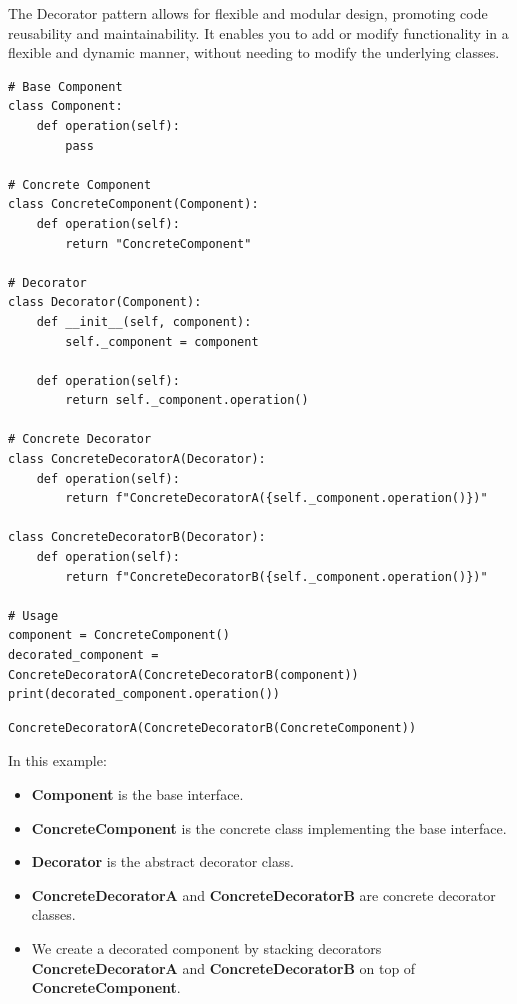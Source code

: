 The Decorator pattern allows for flexible and modular design, promoting code reusability and maintainability. It enables you to add or modify functionality in a flexible and dynamic manner, without needing to modify the underlying classes.\\

\begin{codebox}
\begin{verbatim}
# Base Component
class Component:
    def operation(self):
        pass

# Concrete Component
class ConcreteComponent(Component):
    def operation(self):
        return "ConcreteComponent"

# Decorator
class Decorator(Component):
    def __init__(self, component):
        self._component = component

    def operation(self):
        return self._component.operation()

# Concrete Decorator
class ConcreteDecoratorA(Decorator):
    def operation(self):
        return f"ConcreteDecoratorA({self._component.operation()})"

class ConcreteDecoratorB(Decorator):
    def operation(self):
        return f"ConcreteDecoratorB({self._component.operation()})"

# Usage
component = ConcreteComponent()
decorated_component = ConcreteDecoratorA(ConcreteDecoratorB(component))
print(decorated_component.operation())
\end{verbatim}
\end{codebox}

\begin{verbatim}
ConcreteDecoratorA(ConcreteDecoratorB(ConcreteComponent))
\end{verbatim}

In this example:

\begin{itemize}
    \item \textbf{Component} is the base interface.
    \item \textbf{ConcreteComponent} is the concrete class implementing the base interface.
    \item \textbf{Decorator} is the abstract decorator class.
    \item \textbf{ConcreteDecoratorA} and \textbf{ConcreteDecoratorB} are concrete decorator classes.
    \item We create a decorated component by stacking decorators \textbf{ConcreteDecoratorA} and \textbf{ConcreteDecoratorB} on top of \textbf{ConcreteComponent}.
\end{itemize}


